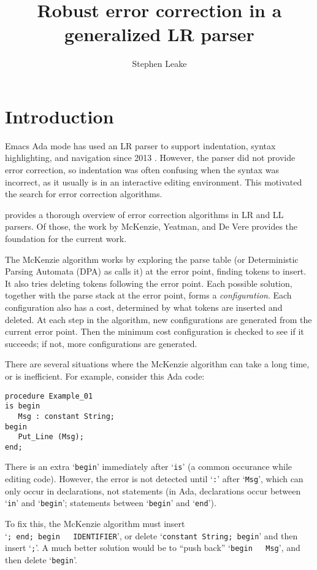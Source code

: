 \documentclass[authordraft]{acmart}
\title{Robust error correction in a generalized LR parser}
\author{Stephen Leake}
\affiliation{retired}
\newcommand{\code}[1]{`\lstinline|#1|'}
\begin{document}
\maketitle
\section{Introduction}
Emacs Ada mode has used an LR parser to support indentation, syntax
highlighting, and navigation since 2013 \citep{Emacs_Ada_mode_news}.
However, the parser did not provide error correction, so indentation
was often confusing when the syntax was incorrect, as it usually is in
an interactive editing environment. This motivated the search for
error correction algorithms.

\citet{Grune_2008} provides a thorough overview of error
correction algorithms in LR and LL parsers. Of those, the work by
McKenzie, Yeatman, and De Vere \citep{McKenzie_1995} provides the
foundation for the current work.

The McKenzie algorithm works by exploring the parse table (or
Deterministic Parsing Automata (DPA) as \citet{McKenzie_1995} calls it)
at the error point, finding tokens to insert. It also tries deleting
tokens following the error point. Each possible solution, together
with the parse stack at the error point, forms a
\textit{configuration}. Each configuration also has a cost, determined
by what tokens are inserted and deleted. At each step in the
algorithm, new configurations are generated from the current error
point. Then the minimum cost configuration is checked to see if it
succeeds; if not, more configurations are generated.

There are several situations where the McKenzie algorithm can take a
long time, or is inefficient. For example, consider this Ada code:
\begin{lstlisting}
procedure Example_01
is begin
   Msg : constant String;
begin
   Put_Line (Msg);
end;
\end{lstlisting}

There is an extra \code{begin} immediately after \code{is} (a common
occurance while editing code). However, the error is not detected
until \code{:} after \code{Msg}, which can only occur in declarations,
not statements (in Ada, declarations occur between \code{in} and
\code{begin}; statements between \code{begin} and \code{end}).

To fix this, the McKenzie algorithm must insert\\ \code{; end; begin
  IDENTIFIER}, or delete \code{constant String; begin} and then insert
\code{;}. A much better solution would be to ``push back'' \code{begin
  Msg}, and then delete \code{begin}.
\end{document}
